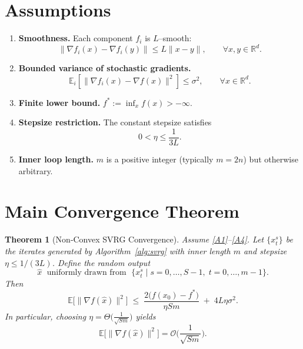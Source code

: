 \documentclass{article}
\newtheorem{theorem}{Theorem}
\begin{document}
\section*{Assumptions}
\begin{enumerate}[label=(A\arabic*)]
\item \label{A1} \textbf{Smoothness.} Each component $f_i$ is $L$–smooth:
\[
\|\nabla f_i(x)-\nabla f_i(y)\|\le L\|x-y\|,\qquad\forall x,y\in\mathbb{R}^{d}.
\]
\item \label{A2} \textbf{Bounded variance of stochastic gradients.}
\[
\mathbb{E}_{i}\!\left[\big\|\nabla f_i(x)-\nabla f(x)\big\|^{2}\right]\le\sigma^{2},
\qquad\forall x\in\mathbb{R}^{d}.
\]
\item \label{A3} \textbf{Finite lower bound.} $f^{*}:=\inf_{x}f(x)>-\infty$.
\item \label{A4} \textbf{Stepsize restriction.} The constant stepsize satisfies
\[
0<\eta\le \frac{1}{3L}.
\]
\item \label{A5} \textbf{Inner loop length.} $m$ is a positive integer (typically $m=2n$) but otherwise arbitrary.
\end{enumerate}

\section*{Main Convergence Theorem}
\begin{theorem}[Non‑Convex SVRG Convergence]\label{thm:svrg}
Assume \ref{A1}–\ref{A4}. Let $\{x_{t}^{s}\}$ be the iterates generated by Algorithm~\ref{alg:svrg} with inner length $m$ and stepsize $\eta\le 1/(3L)$. Define the random output
\[
\hat{x}\;\text{ uniformly drawn from }\;\Big\{x_{t}^{s}\mid s=0,\dots,S-1,\;t=0,\dots,m-1\Big\}.
\]
Then
\[
\mathbb{E}\!\big[\|\nabla f(\hat{x})\|^{2}\big]
    \;\le\;
    \frac{2\big(f(x_{0})-f^{*}\big)}{\eta Sm}
    \;+\;
    4L\eta\sigma^{2}.
\tag{2}
\]
In particular, choosing $\eta = \Theta\!\big(\frac{1}{\sqrt{Sm}}\big)$ yields
\[
\mathbb{E}\!\big[\|\nabla f(\hat{x})\|^{2}\big]=\mathcal{O}\!\Big(\frac{1}{\sqrt{Sm}}\Big).
\]
\end{theorem}
\end{document}
